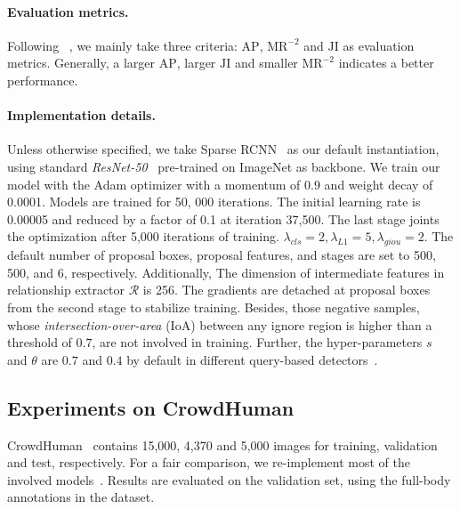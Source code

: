 \documentclass[final]{cvpr}
\begin{document}
\vspace{-1pc} 
\paragraph{Evaluation metrics.}

Following ~\cite{chu2020detection}, we mainly take three criteria: $\text{AP}$, $\text{MR}^{-2}$ and $\text{JI}$ as evaluation metrics. Generally, a larger $\text{AP}$, larger $\text{JI}$ and smaller $\text{MR}^{-2}$ indicates a better performance.

\vspace{-1pc} 
\paragraph{Implementation details.} 
Unless otherwise specified, we take Sparse RCNN~\cite{sun2020sparse} as our default instantiation, using standard \textit{ResNet-50}~\cite{he2016deep} pre-trained on ImageNet as backbone. We train our model with the Adam optimizer with a momentum of 0.9 and weight decay of 0.0001. Models are trained for 50, 000 iterations. The initial learning rate is 0.00005 and reduced by a factor of 0.1 at iteration 37,500. The last stage joints the optimization after 5,000 iterations of training. $\lambda_{cls}=2, \lambda_{L1}=5, \lambda_{giou}=2$. The default number of proposal boxes, proposal features, and stages are set to 500, 500, and 6, respectively. Additionally, The dimension of intermediate features in relationship extractor $\mathcal{R}$ is 256. The gradients are detached at proposal boxes from the second stage to stabilize training. Besides, those negative samples, whose \textit{intersection-over-area} (IoA) between any ignore region is higher than a threshold of $0.7$,  are not involved in training. Further, the hyper-parameters $s$ and $\theta$ are $0.7$ and $0.4$ by default in different query-based detectors~\cite{sun2020sparse,zhu2021deformable}. 

\subsection{Experiments on CrowdHuman}
CrowdHuman~\cite{shao2018crowdhuman} contains 15,000, 4,370 and 5,000 images for training, validation and test, respectively. For a fair comparison, we re-implement most of the involved models~\cite{lin2017feature,huang2020nms,lin2020focal,liu2019adaptive,2020atss,chu2020detection,tian2021fcos, wang2020end,carion2020end,zhu2021deformable, sun2020sparse,lin2020detr, gossipnet, hu2018relation}. Results are evaluated on the validation set, using the full-body annotations in the dataset.
\end{document}
